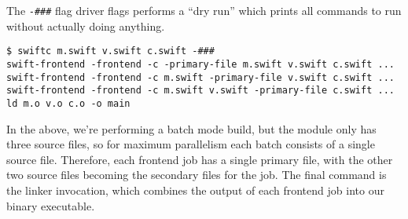 \documentclass[a4paper,headsepline,bibliography=totoc,toc=flat,fleqn,twoside=semi]{scrbook}
\theoremstyle{definition}
\theoremstyle{definition}
\theoremstyle{definition}
\begin{document}
The \verb|-###| flag driver flags performs a ``dry run'' which prints all commands to run without actually doing anything.
\begin{Verbatim}
$ swiftc m.swift v.swift c.swift -###
swift-frontend -frontend -c -primary-file m.swift v.swift c.swift ...
swift-frontend -frontend -c m.swift -primary-file v.swift c.swift ...
swift-frontend -frontend -c m.swift v.swift -primary-file c.swift ...
ld m.o v.o c.o -o main
\end{Verbatim}
In the above, we're performing a batch mode build, but the module only has three source files, so for maximum parallelism each batch consists of a single source file. Therefore, each frontend job has a single primary file, with the other two source files becoming the secondary files for the job. The final command is the linker invocation, which combines the output of each frontend job into our binary executable.

\begin{figure}\label{compilerpipeline}
\begin{center}
\end{center}
\end{figure}
\end{document}
